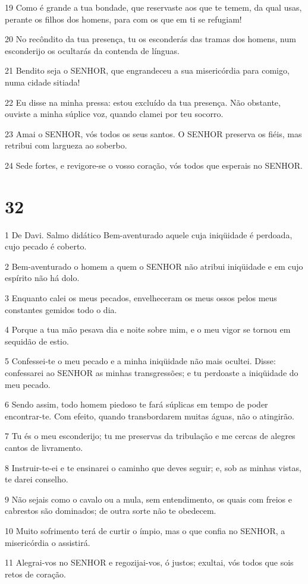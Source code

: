 \par 19 Como é grande a tua bondade, que reservaste aos que te temem, da qual usas, perante os filhos dos homens, para com os que em ti se refugiam!
\par 20 No recôndito da tua presença, tu os esconderás das tramas dos homens, num esconderijo os ocultarás da contenda de línguas.
\par 21 Bendito seja o SENHOR, que engrandeceu a sua misericórdia para comigo, numa cidade sitiada!
\par 22 Eu disse na minha pressa: estou excluído da tua presença. Não obstante, ouviste a minha súplice voz, quando clamei por teu socorro.
\par 23 Amai o SENHOR, vós todos os seus santos. O SENHOR preserva os fiéis, mas retribui com largueza ao soberbo.
\par 24 Sede fortes, e revigore-se o vosso coração, vós todos que esperais no SENHOR.

\chapter{32}

\par 1 De Davi. Salmo didático Bem-aventurado aquele cuja iniqüidade é perdoada, cujo pecado é coberto.
\par 2 Bem-aventurado o homem a quem o SENHOR não atribui iniqüidade e em cujo espírito não há dolo.
\par 3 Enquanto calei os meus pecados, envelheceram os meus ossos pelos meus constantes gemidos todo o dia.
\par 4 Porque a tua mão pesava dia e noite sobre mim, e o meu vigor se tornou em sequidão de estio.
\par 5 Confessei-te o meu pecado e a minha iniqüidade não mais ocultei. Disse: confessarei ao SENHOR as minhas transgressões; e tu perdoaste a iniqüidade do meu pecado.
\par 6 Sendo assim, todo homem piedoso te fará súplicas em tempo de poder encontrar-te. Com efeito, quando transbordarem muitas águas, não o atingirão.
\par 7 Tu és o meu esconderijo; tu me preservas da tribulação e me cercas de alegres cantos de livramento.
\par 8 Instruir-te-ei e te ensinarei o caminho que deves seguir; e, sob as minhas vistas, te darei conselho.
\par 9 Não sejais como o cavalo ou a mula, sem entendimento, os quais com freios e cabrestos são dominados; de outra sorte não te obedecem.
\par 10 Muito sofrimento terá de curtir o ímpio, mas o que confia no SENHOR, a misericórdia o assistirá.
\par 11 Alegrai-vos no SENHOR e regozijai-vos, ó justos; exultai, vós todos que sois retos de coração.

